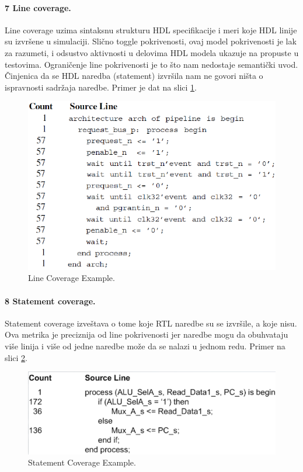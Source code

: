 \documentclass[a4paper, 12pt]{article}
\begin{document}
\paragraph{7 Line coverage.}
\hfill \break
\indent Line coverage uzima sintaksnu strukturu HDL specifikacije i meri koje HDL linije su izvršene u simulaciji. Slično toggle pokrivenosti, ovaj model pokrivenosti je lak za razumeti, i odsustvo aktivnosti u delovima HDL modela ukazuje na propuste u testovima. Ograničenje line pokrivenosti je to što nam nedostaje semantički uvod. Činjenica da se HDL naredba (statement) izvršila nam ne govori ništa o ispravnosti sadržaja naredbe. Primer je dat na slici \ref{img-p10-4}.
\begin{figure}[h!]
\centering
\includegraphics[scale=0.5]{img-p10-4.png}
\caption{Line Coverage Example.}
\label{img-p10-4}
\end{figure}
\paragraph{8 Statement coverage.}
\hfill \break
\indent Statement coverage izveštava o tome koje RTL naredbe su se izvršile, a koje nisu. Ova metrika je preciznija od line pokrivenosti jer naredbe mogu da obuhvataju više linija i više od jedne naredbe može da se nalazi u jednom redu. Primer na slici \ref{img-p10-5}.
\begin{figure}[h!]
\centering
\includegraphics[scale=0.5]{img-p10-5.png}
\caption{Statement Coverage Example.}
\label{img-p10-5}
\end{figure}
\end{document}
